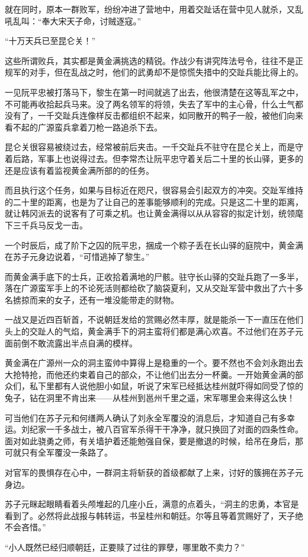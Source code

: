 就在同时，原本一群败军，纷纷冲进了营地中，用着交趾话在营中见人就杀，又乱吼乱叫：“奉大宋天子命，讨贼逐寇。”

“十万天兵已至昆仑关！”

这些所谓败兵，其实都是黄金满挑选的精锐。作战少有讲究阵法号令，往往不是正规军的对手，但在乱战之时，他们的武勇却不是惊慌失措中的交趾兵能比得上的。

一见阮平忠被打落马下，黎生在第一时间就逃了出去，他很清楚在这等乱军之中，不可能再收拾起兵马来。没了两名领军的将领，失去了军中的主心骨，什么士气都没有了，一千交趾兵连像样反击都组织不起来，如同散开的鸭子一般，被他们向来看不起的广源蛮兵拿着刀枪一路追杀下去。

昆仑关很容易被绕过去，经常被前后夹击。一千交趾兵不驻守在昆仑关上，而是守着后路，军事上也说得过去。但李常杰让阮平忠守着关后二十里的长山驿，更多的还是应该有着监视黄金满所部的的任务。

而且执行这个任务，如果与目标近在咫尺，很容易会引起双方的冲突。交趾军维持的二十里的距离，也是为了让自己的差事能够顺利的完成。只是这二十里的距离，就让韩冈派去的说客有了可乘之机。也让黄金满得以从从容容的拟定计划，统领麾下三千兵马反戈一击。

一个时辰后，成了阶下之囚的阮平忠，捆成一个粽子丢在长山驿的庭院中，黄金满在苏子元身边说着，“可惜逃掉了黎生。”

而黄金满手底下的士兵，正收拾着满地的尸骸。驻守长山驿的交趾兵跑了一多半，落在广源蛮军手上的不论死活则都给砍了脑袋夏利，又从交趾军营中救出了六十多名掳掠而来的女子，还有一堆没能带走的财物。

一战又是近四百斩首，不说朝廷发给的赏赐必然丰厚，就是能杀一下一直压在他们头上的交趾人的气焰，黄金满手下的洞主蛮将们都是满心欢喜。不过他们在苏子元面前倒不敢流露出半点自满的模样。

黄金满在广源州一众的洞主蛮帅中算得上是稳重的一个。要不然也不会刘永跑出去大抢特抢，而他还约束着自己的部众，不让他们出去分一杯羹。一开始黄金满的部众们，私下里都有人说他胆小如鼠，听说了宋军已经抵达桂州就吓得如同受了惊的兔子，钻在洞里不肯出来——从桂州到邕州千里之遥，宋军哪里会来得这么快！

可当他们在苏子元和何缮两人确认了刘永全军覆没的消息后，才知道自己有多幸运。刘纪家一千多战士，被八百官军杀得干干净净，就只换回了对面的四条性命。面对如此骁勇之师，有关墙护着还能勉强自保，要是撤退的时候，给吊在身后，那可就只有全军覆没一条路了。

对官军的畏惧存在心中，一群洞主将斩获的首级都献了上来，讨好的簇拥在苏子元身边。

苏子元眯起眼睛看着头颅堆起的几座小丘，满意的点着头，“洞主的忠勇，本官是看到了。必然将此战报与韩转运，书呈桂州和朝廷。尔等且等着赏赐好了，天子绝不会吝惜。”

“小人既然已经归顺朝廷，正要赎了过往的罪孽，哪里敢不卖力？”

